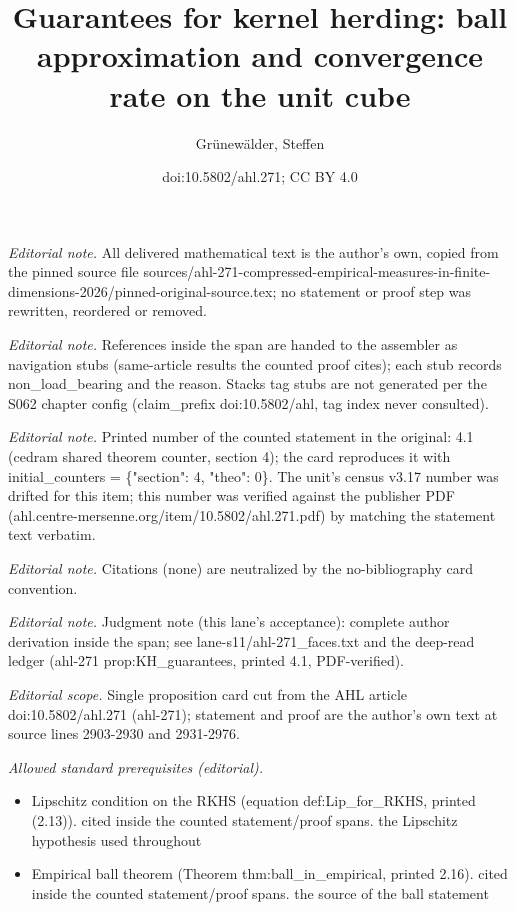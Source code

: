 \documentclass[11pt]{article}
\title{Guarantees for kernel herding: ball approximation and convergence rate on the unit cube}
\author{Grünewälder, Steffen}
\date{doi:10.5802/ahl.271; CC BY 4.0}
\begin{document}
\maketitle
\setcounter{section}{4}
\setcounter{theo}{0}
\noindent\textit{Editorial note.} All delivered mathematical text is the author's own, copied from the pinned source file sources/ahl-271-compressed-empirical-measures-in-finite-dimensions-2026/pinned-original-source.tex; no statement or proof step was rewritten, reordered or removed.\par\medskip
\noindent\textit{Editorial note.} References inside the span are handed to the assembler as navigation stubs (same-article results the counted proof cites); each stub records non\_load\_bearing and the reason. Stacks tag stubs are not generated per the S062 chapter config (claim\_prefix doi:10.5802/ahl, tag index never consulted).\par\medskip
\noindent\textit{Editorial note.} Printed number of the counted statement in the original: 4.1 (cedram shared theorem counter, section 4); the card reproduces it with initial\_counters = \{"section": 4, "theo": 0\}. The unit's census v3.17 number was drifted for this item; this number was verified against the publisher PDF (ahl.centre-mersenne.org/item/10.5802/ahl.271.pdf) by matching the statement text verbatim.\par\medskip
\noindent\textit{Editorial note.} Citations (none) are neutralized by the no-bibliography card convention.\par\medskip
\noindent\textit{Editorial note.} Judgment note (this lane's acceptance): complete author derivation inside the span; see lane-s11/ahl-271\_faces.txt and the deep-read ledger (ahl-271 prop:KH\_guarantees, printed 4.1, PDF-verified).\par\medskip
\noindent\textit{Editorial scope.} Single proposition card cut from the AHL article doi:10.5802/ahl.271 (ahl-271); statement and proof are the author's own text at source lines 2903-2930 and 2931-2976.\par\medskip
\noindent\textit{Allowed standard prerequisites (editorial).}\begin{itemize}
\item Lipschitz condition on the RKHS (equation def:Lip\_for\_RKHS, printed (2.13)). cited inside the counted statement/proof spans. the Lipschitz hypothesis used throughout
\item Empirical ball theorem (Theorem thm:ball\_in\_empirical, printed 2.16). cited inside the counted statement/proof spans. the source of the ball statement
\end{itemize}\medskip
\end{document}
